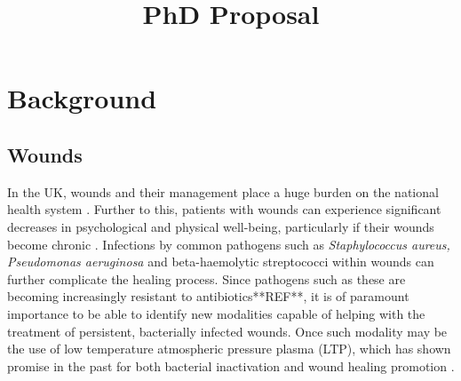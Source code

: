 \documentclass[11pt, oneside]{article}   	%
\title{PhD Proposal}
\date{}							%
\begin{document}
\maketitle
\section*{Background}
\subsection*{Wounds}

In the UK, wounds and their management place a huge burden on the national health system \cite{Posnett2008burden}. Further to this, patients with wounds can experience significant decreases in psychological and physical well-being, particularly if their wounds become chronic \cite{Franks2003health}. 
Infections by common pathogens such as \textit{Staphylococcus aureus, Pseudomonas aeruginosa} and beta-haemolytic streptococci \cite{Bowler2001wound} within wounds can further complicate the healing process. Since pathogens such as these are becoming increasingly resistant to antibiotics**REF**, it is of paramount importance to be able to identify new modalities capable of helping with the treatment of persistent, bacterially infected wounds.
Once such modality may be the use of low temperature atmospheric pressure plasma (LTP), which has shown promise in the past for both bacterial inactivation and wound healing promotion \cite{Kong2009plasma, Kramer2013suitability, Isbary2012successful, Isbary2010a}.

\end{document}
